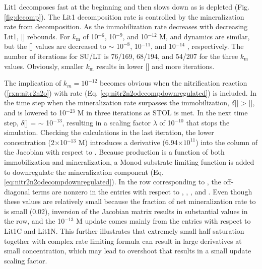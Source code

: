 \documentclass[gmd, manuscript]{copernicus}
\begin{document}
Lit1 decomposes fast at the beginning and then slows down as  is
depleted (Fig. \ref{fig:decomp}). The Lit1 decomposition rate is controlled by the
mineralization rate from  decomposition. As the immobilization rate
decreases with decreasing Lit1, [] rebounds. For $k_\text{m}$ of
10$^{-6}$, 10$^{-9}$, and 10$^{-12}$ M,  and  dynamics
are similar, but the [] values are decreased to $\sim$ 1$0^{-8}$,
10$^{-11}$, and 10$^{-14}$ , respectively. The number of iterations for
SU/LT is 76/169, 68/194, and 54/207 for the three $k_\text{m}$ values.
Obviously, smaller $k_\text{m}$ results in lower [] and more
iterations. 

The implication of $k_m=10^{-12}$ becomes obvious when the nitrification
reaction (\ref{rxn:nitr2n2o}) with rate (Eq.
\ref{eq:nitr2n2odecompdownregulated}) is included. In the time step when the
mineralization rate surpasses the immobilization, $\delta$[] >
[], and  is lowered to 10$^{-23}$ \unit{M} in three
iterations as STOL is met. In the next time step, $\delta$[] =
$\sim$ 10$^{-13}$, resulting in a scaling factor $\lambda$ of 10$^{-10}$ that
stops the simulation. Checking the calculations in the last iteration, the
lower  concentration (2$\times$10$^{-13}$ \unit{M}) introduces a
derivative (6.94$\times 10^{11}$) into the column of the Jacobian with respect
to . Because  production is a function of both
immobilization and mineralization, a Monod substrate limiting function is added
to downregulate the mineralization component (Eq.
\ref{eq:nitr2n2odecompdownregulated}). In the row corresponding to
, the off-diagonal terms are nonzero in the entries with respect to
, ,
, and . Even though these values are relatively small
because the fraction of net mineralization rate to  is small (0.02),
inversion of the Jacobian matrix results in substantial values in the row, and
the 10$^{-13}$ \unit{M} update comes mainly from the entries with respect to
Lit1C and Lit1N. This further illustrates that
extremely small half saturation together with complex rate limiting formula can
result in large derivatives at small
concentration, which may lead to overshoot that results in a small update scaling
factor. 

%
\end{document}
